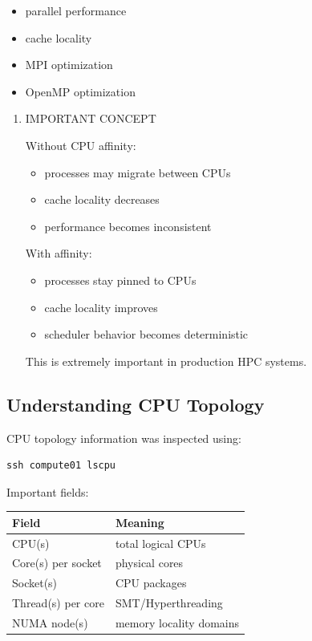 \documentclass[11pt]{article}
\begin{document}
\begin{itemize}
\item parallel performance
\item cache locality
\item MPI optimization
\item OpenMP optimization
\end{itemize}
\begin{enumerate}
\item IMPORTANT CONCEPT
\label{sec:orgfda6dbb}

Without CPU affinity:

\begin{itemize}
\item processes may migrate between CPUs
\item cache locality decreases
\item performance becomes inconsistent
\end{itemize}

With affinity:

\begin{itemize}
\item processes stay pinned to CPUs
\item cache locality improves
\item scheduler behavior becomes deterministic
\end{itemize}

This is extremely important in production HPC systems.
\end{enumerate}
\subsection{Understanding CPU Topology}
\label{sec:orgc3bdb3e}

CPU topology information was inspected using:

\begin{verbatim}
ssh compute01 lscpu
\end{verbatim}

Important fields:

\begin{center}
\begin{tabular}{ll}
Field & Meaning\\
\hline
CPU(s) & total logical CPUs\\
Core(s) per socket & physical cores\\
Socket(s) & CPU packages\\
Thread(s) per core & SMT/Hyperthreading\\
NUMA node(s) & memory locality domains\\
\end{tabular}
\end{center}
\end{document}
